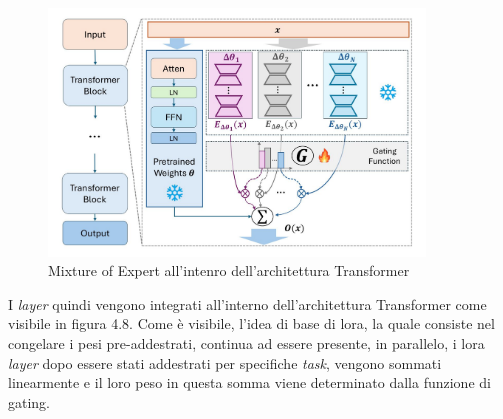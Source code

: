         \begin{figure}[htp]
            \centering        
            \includegraphics[width=10cm]{img/MoE1.pdf}
            \caption{Mixture of Expert all'intenro dell'architettura Transformer}
        \end{figure}

        
        I \textit{layer} quindi vengono integrati all'interno dell'architettura Transformer come visibile in figura 4.8.
        Come è visibile, l'idea di base di \gls{lora}, la quale consiste nel congelare i pesi pre-addestrati, continua ad essere presente, in parallelo, i \gls{lora} \textit{layer} dopo essere stati addestrati per specifiche \textit{task}, vengono sommati linearmente e il loro peso in questa somma viene determinato dalla funzione di gating.


